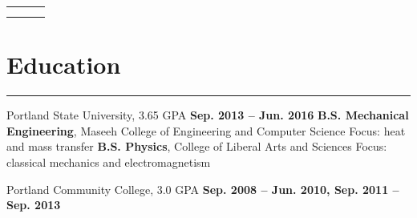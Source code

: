 

\newlength{\rcollength}\setlength{\rcollength}{3.0in}%
\begin{tabular} {
  p{}
  p{}
  p{}}
	\begin{flushleft}
		\address
	\end{flushleft}
	&
	\begin{center}
	\Large{\author}
	\end{center}
	&
	\begin{flushright}
		{\phnum}\\
 	    {\email} 	 
	\end{flushright}
\end{tabular}

\vfill
\section{Education}
	\noindent\rule{\textwidth}{\hlinewidth}
	\begin{innerlist}
	\item Portland State University, 3.65 GPA	\hfill\textbf{Sep. 2013 -- Jun. 2016}
		\subitem \textbf{B.S. Mechanical Engineering}, Maseeh College of Engineering and Computer Science
		\subsubitem Focus: heat and mass transfer
		\subitem\textbf{B.S. Physics}, College of Liberal Arts and Sciences
		\subsubitem Focus: classical mechanics and electromagnetism
		\subitem 
	\item Portland Community College, 3.0 GPA	\hfill\textbf{Sep. 2008 -- Jun. 2010, Sep. 2011 -- Sep. 2013}
	\end{innerlist}


